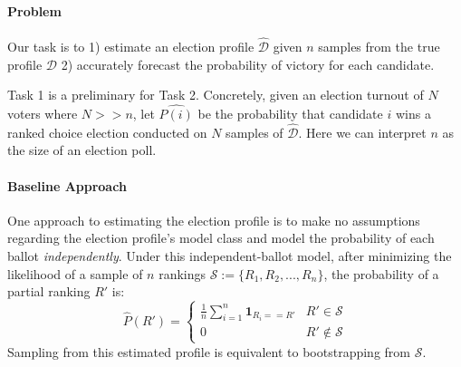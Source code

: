 \documentclass{article}
\begin{document}
\paragraph{Problem} Our task is to 1) estimate an election profile $\hat{\mathcal{D}}$ given $n$ samples from the true profile $\mathcal{D}$ 2) accurately forecast the probability of victory for each candidate. 

Task 1 is a preliminary for Task 2. Concretely, given an election turnout of $N$ voters where $N >> n$, let $\hat{P(i)}$ be the probability that candidate $i$ wins a ranked choice election conducted on $N$ samples of $\hat{\mathcal{D}}$. Here we can interpret $n$ as the size of an election poll.

\paragraph{Baseline Approach} One approach to estimating the election profile is to make no assumptions regarding the election profile's model class and model the probability of each ballot \emph{independently}. Under this independent-ballot model, after minimizing the likelihood of a sample of $n$ rankings $\mathcal{S} := \{R_1, R_2, ..., R_n\}$, the probability of a partial ranking $R'$ is:
\begin{equation}
\hat{P}(R') =
\begin{cases}
\frac{1}{n}\sum_{i=1}^n \mathbf{1}_{R_i == R'} & R' \in \mathcal{S} \\
0 & R' \notin \mathcal{S}
\end{cases}
\end{equation}
Sampling from this estimated profile is equivalent to bootstrapping from $\mathcal{S}$.
\end{document}
